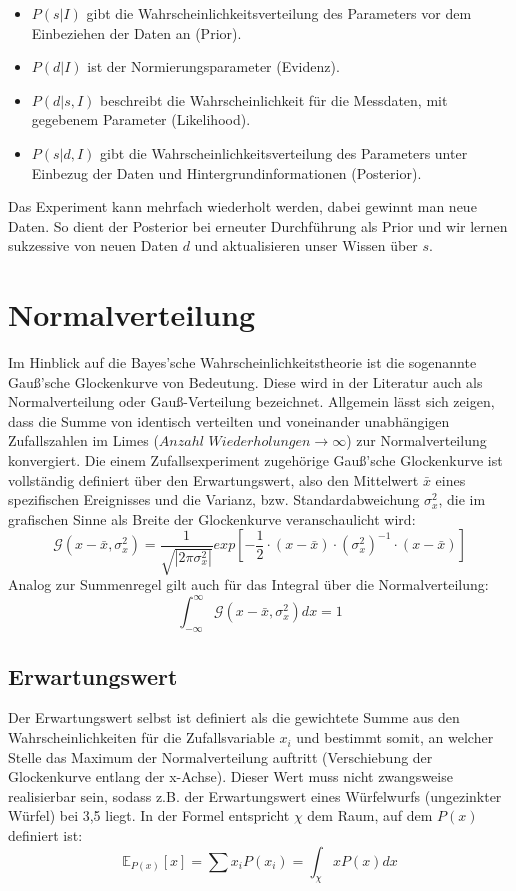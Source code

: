 \documentclass[]{dsadokumentation}
\begin{document}
\begin{itemize}
 \item $P(s|I)$ gibt die Wahrscheinlichkeitsverteilung des Parameters vor dem Einbeziehen der Daten an (Prior).
 \item $P(d|I)$ ist der Normierungsparameter (Evidenz).
 \item $P(d|s,I)$ beschreibt die Wahrscheinlichkeit für die Messdaten, mit gegebenem Parameter (Likelihood).
 \item $P(s|d,I)$ gibt die Wahrscheinlichkeitsverteilung des Parameters unter Einbezug der Daten und Hintergrundinformationen (Posterior).
\end{itemize}

Das Experiment kann mehrfach wiederholt werden, dabei gewinnt man neue Daten. So dient der Posterior bei erneuter Durchführung als Prior und wir lernen sukzessive von neuen Daten $d$ und aktualisieren unser Wissen über $s$.

\section{Normalverteilung}

Im Hinblick auf die Bayes'sche Wahrscheinlichkeitstheorie ist die sogenannte Gauß'sche Glockenkurve von Bedeutung. Diese wird in der Literatur auch als Normalverteilung oder Gauß-Verteilung bezeichnet.
Allgemein lässt sich zeigen, dass die Summe von identisch verteilten und voneinander unabhängigen Zufallszahlen im Limes ($Anzahl$ $Wiederholungen \rightarrow \infty$) zur Normalverteilung konvergiert.
Die einem Zufallsexperiment zugehörige Gauß'sche Glockenkurve ist vollständig definiert über den Erwartungswert, also den Mittelwert $\bar{x}$ eines spezifischen Ereignisses und die Varianz, bzw. Standardabweichung $\sigma_x^{2}$, die im grafischen Sinne als Breite der Glockenkurve veranschaulicht wird:
\[ \mathcal{G} (x - \bar{x}, \sigma_x^{2}) = \displaystyle\frac{1}{\sqrt{|2 \pi \sigma_x^{2}|}} exp[- \displaystyle\frac{1}{2} \cdot (x - \bar{x}) \cdot (\sigma_x^{2})^{-1} \cdot (x - \bar{x})] \]
Analog zur Summenregel gilt auch für das Integral über die Normalverteilung:
\[ \int_{- \infty}^{\infty} \mathcal{G} (x - \bar{x}, \sigma _x ^{2}) dx = 1\]

\subsection{Erwartungswert}
Der Erwartungswert selbst ist definiert als die gewichtete Summe aus den Wahrscheinlichkeiten für die Zufallsvariable $x _i$ und bestimmt somit, an welcher Stelle das Maximum der Normalverteilung auftritt (Verschiebung der Glockenkurve entlang der x-Achse). Dieser Wert muss nicht zwangsweise realisierbar sein, sodass z.B. der Erwartungswert eines Würfelwurfs (ungezinkter Würfel) bei 3,5 liegt. In der Formel entspricht $\chi$ dem Raum, auf dem $P(x)$ definiert ist:
\[ \mathbb{E} _{P(x)} [x] = \sum x _i P(x _i) = \int_{\chi} x P(x) dx \]
\end{document}
